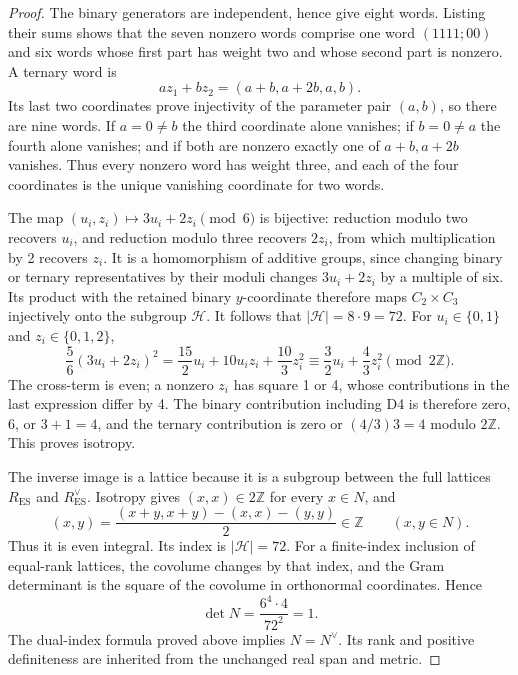 \begin{proof}
The binary generators are independent, hence give eight words.  Listing
their sums shows that the seven nonzero words comprise one word
\((1111;00)\) and six words whose first part has weight two and whose
second part is nonzero.  A ternary word is
\[
 az_1+bz_2=(a+b,a+2b,a,b).
\]
Its last two coordinates prove injectivity of the parameter pair
\((a,b)\), so there are nine words.  If \(a=0\ne b\) the third
coordinate alone vanishes; if \(b=0\ne a\) the fourth alone vanishes;
and if both are nonzero exactly one of \(a+b,a+2b\) vanishes.
Thus every nonzero word has weight three, and each of the four
coordinates is the unique vanishing coordinate for two words.

The map \((u_i,z_i)\mapsto3u_i+2z_i\pmod6\) is bijective:
reduction modulo two recovers \(u_i\), and reduction modulo three
recovers \(2z_i\), from which multiplication by 2 recovers \(z_i\).
It is a homomorphism of additive groups, since changing binary or
ternary representatives by their moduli changes \(3u_i+2z_i\) by a
multiple of six.  Its product with the retained binary \(y\)-coordinate
therefore maps \(C_2\times C_3\) injectively onto the subgroup
\(\mathcal H\).  It follows that \(|\mathcal H|=8\cdot9=72\).  For
\(u_i\in\{0,1\}\) and \(z_i\in\{0,1,2\}\),
\[
 \frac56(3u_i+2z_i)^2
 =\frac{15}{2}u_i+10u_iz_i+\frac{10}{3}z_i^2
 \equiv\frac32u_i+\frac43z_i^2\pmod {2\mathbb Z}.
\]
The cross-term is even; a nonzero \(z_i\) has square 1 or 4, whose
contributions in the last expression differ by 4.  The binary
contribution including D4 is therefore zero, 6, or \(3+1=4\), and
the ternary contribution is zero or \((4/3)3=4\) modulo
\(2\mathbb Z\).  This proves isotropy.

The inverse image is a lattice because it is a subgroup between the
full lattices \(R_{\mathrm{ES}}\) and \(R_{\mathrm{ES}}^\vee\).
Isotropy gives \((x,x)\in2\mathbb Z\) for every \(x\in N\), and
\[
 (x,y)=\frac{(x+y,x+y)-(x,x)-(y,y)}2\in\mathbb Z
                                    \qquad(x,y\in N).
\]
Thus it is even integral.  Its index is \(|\mathcal H|=72\).
For a finite-index inclusion of equal-rank lattices, the covolume
changes by that index, and the Gram determinant is the square of the
covolume in orthonormal coordinates.  Hence
\[
 \det N=\frac{6^4\cdot4}{72^2}=1.
\]
The dual-index formula proved above implies \(N=N^\vee\).
Its rank and positive definiteness are inherited from the unchanged real
span and metric.


\end{proof}
